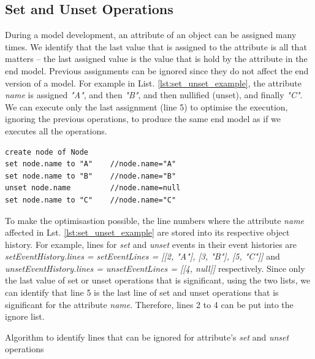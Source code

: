 \documentclass[sigconf]{acmart}
\begin{document}
\subsection{Set and Unset Operations}
\label{subsec:set_and_unset_operations}
During a model development, an attribute of an object can be assigned many times. We identify that the last value that is assigned to the attribute is all that matters -- the last assigned value is the value that is hold by the attribute in the end model. Previous assignments can be ignored since they do not affect the end version of a model. For example in List. \ref{lst:set_unset_example}, the attribute \emph{name} is assigned \emph{"A"}, and then \emph{"B"}, and then nullified (unset), and finally \emph{"C"}. We can execute only the last assignment (line 5) to optimise the execution, ignoring the previous operations, to produce the same end model as if we executes all the operations. 

\begin{lstlisting}[style=eol,caption={Example of CBP representation of \emph{name} attribute assignments.},label=lst:set_unset_example]
create node of Node
set node.name to "A"    //node.name="A"    
set node.name to "B"    //node.name="B"
unset node.name         //node.name=null
set node.name to "C"    //node.name="C"
\end{lstlisting}

To make the optimisastion possible, the line numbers where the attribute \emph{name} affected in Lst. \ref{lst:set_unset_example} are stored into its respective object history.  For example, lines for \emph{set} and \emph{unset} events in their event histories are \emph{setEventHistory.lines = setEventLines = [[2, "A"], [3, "B"], [5, "C"]]} and \emph{unsetEventHistory.lines = unsetEventLines = [[4, null]]} respectively. Since only the last value of set or unset operations that is significant, using the two lists, we can identify that line 5 is the last line of set and unset operations that is significant for the attribute \emph{name}. Therefore, lines 2 to 4 can be put into the ignore list.  

\begin{algorithm}
\caption{Algorithm to identify lines that can be ignored for attribute's \emph{set} and \emph{unset} operations}
\label{alg:set_unset_optimisation}
\end{algorithm}
\end{document}
